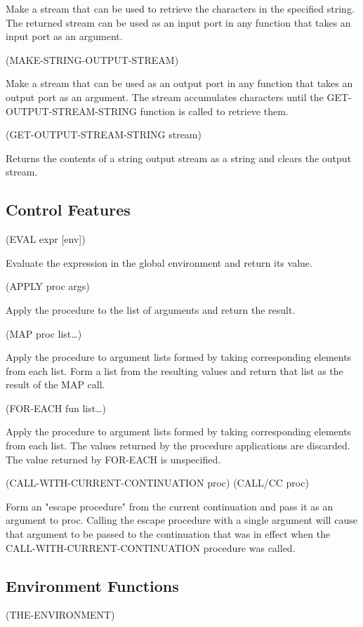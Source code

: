 \documentclass[11pt]{article}
\begin{document}
Make a stream that can be used to retrieve the characters in the
specified string.  The returned stream can be used as an input port in
any function that takes an input port as an argument.

(MAKE-STRING-OUTPUT-STREAM)

Make a stream that can be used as an output port in any function that
takes an output port as an argument.  The stream accumulates characters
until the GET-OUTPUT-STREAM-STRING function is called to retrieve them.

(GET-OUTPUT-STREAM-STRING stream)

Returns the contents of a string output stream as a string and clears
the output stream.
\subsection{Control Features}
\label{sec-1-41}

(EVAL expr [env])

Evaluate the expression in the global environment and return its value.

(APPLY proc args)

Apply the procedure to the list of arguments and return the result.

(MAP proc list\ldots{})

Apply the procedure to argument lists formed by taking corresponding
elements from each list. Form a list from the resulting values and
return that list as the result of the MAP call.

(FOR-EACH fun list\ldots{})

Apply the procedure to argument lists formed by taking corresponding
elements from each list. The values returned by the procedure
applications are discarded. The value returned by FOR-EACH is
unspecified.

(CALL-WITH-CURRENT-CONTINUATION proc)
(CALL/CC proc)

Form an "escape procedure" from the current continuation and pass it as
an argument to proc. Calling the escape procedure with a single argument
will cause that argument to be passed to the continuation that was in
effect when the CALL-WITH-CURRENT-CONTINUATION procedure was called.
\subsection{Environment Functions}
\label{sec-1-42}

(THE-ENVIRONMENT)
\end{document}
